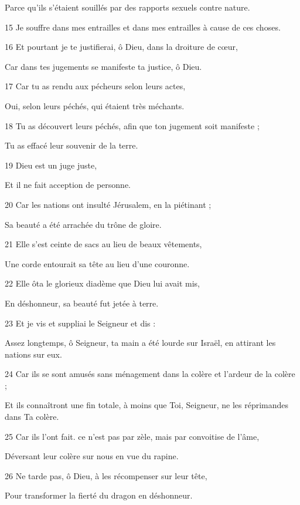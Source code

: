 \par     Parce qu'ils s'étaient souillés par des rapports sexuels contre nature.
\par 15 Je souffre dans mes entrailles et dans mes entrailles à cause de ces choses.
\par   
\par 16 Et pourtant je te justifierai, ô Dieu, dans la droiture de cœur,
\par     Car dans tes jugements se manifeste ta justice, ô Dieu.
\par 17 Car tu as rendu aux pécheurs selon leurs actes,
\par     Oui, selon leurs péchés, qui étaient très méchants.
\par 18 Tu as découvert leurs péchés, afin que ton jugement soit manifeste ;
\par     Tu as effacé leur souvenir de la terre.
\par 19 Dieu est un juge juste,
\par     Et il ne fait acception de personne.
\par 20 Car les nations ont insulté Jérusalem, en la piétinant ;
\par     Sa beauté a été arrachée du trône de gloire.
\par 21 Elle s'est ceinte de sacs au lieu de beaux vêtements,
\par     Une corde entourait sa tête au lieu d'une couronne.
\par 22 Elle ôta le glorieux diadème que Dieu lui avait mis,
\par     En déshonneur, sa beauté fut jetée à terre.
\par 23 Et je vis et suppliai le Seigneur et dis :
\par     Assez longtemps, ô Seigneur, ta main a été lourde sur Israël, en attirant les nations sur eux.
\par 24 Car ils se sont amusés sans ménagement dans la colère et l'ardeur de la colère ;
\par     Et ils connaîtront une fin totale, à moins que Toi, Seigneur, ne les réprimandes dans Ta colère.
\par 25 Car ils l'ont fait. ce n'est pas par zèle, mais par convoitise de l'âme,
\par     Déversant leur colère sur nous en vue du rapine.
\par 26 Ne tarde pas, ô Dieu, à les récompenser sur leur tête,
\par     Pour transformer la fierté du dragon en déshonneur.
